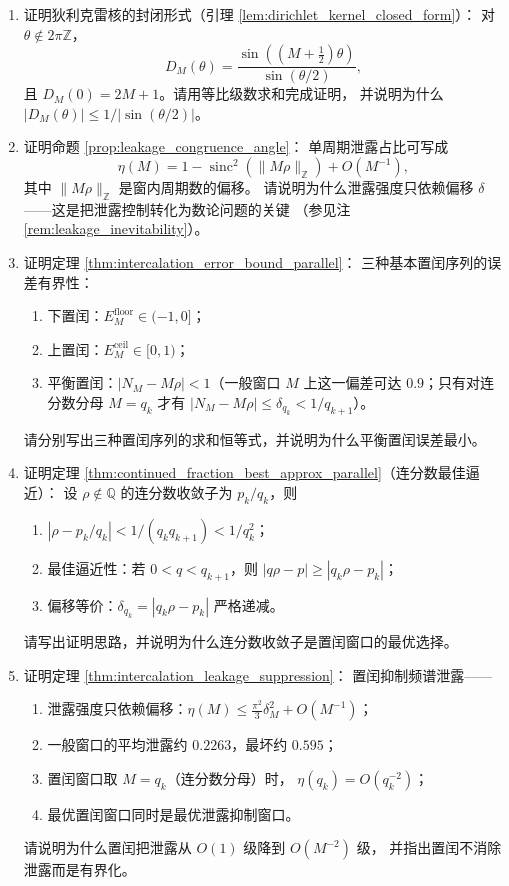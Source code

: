 \begin{enumerate}[leftmargin=3em, label=\textbf{题 \arabic*}]
    \item 证明狄利克雷核的封闭形式（引理 \ref{lem:dirichlet_kernel_closed_form}）：
    对 $\theta\notin2\pi\mathbb{Z}$，
    \[
    D_M(\theta)=\frac{\sin((M+\frac12)\theta)}{\sin(\theta/2)},
    \]
    且 $D_M(0)=2M+1$。请用等比级数求和完成证明，
    并说明为什么 $|D_M(\theta)|\le1/|\sin(\theta/2)|$。

    \item 证明命题 \ref{prop:leakage_congruence_angle}：
    单周期泄露占比可写成
    \[
    \eta(M)=1-\operatorname{sinc}^2(\|M\rho\|_{\mathbb{Z}})+O(M^{-1}),
    \]
    其中 $\|M\rho\|_{\mathbb{Z}}$ 是窗内周期数的偏移。
    请说明为什么泄露强度只依赖偏移 $\delta$——这是把泄露控制转化为数论问题的关键
    （参见注 \ref{rem:leakage_inevitability}）。

    \item 证明定理 \ref{thm:intercalation_error_bound_parallel}：
    三种基本置闰序列的误差有界性：
    \begin{enumerate}[label=(\roman*)]
        \item 下置闰：$E_M^{\mathrm{floor}}\in(-1,0]$；
        \item 上置闰：$E_M^{\mathrm{ceil}}\in[0,1)$；
        \item 平衡置闰：$\big|N_M-M\rho\big|<1$（一般窗口 $M$ 上这一偏差可达 $0.9$；只有对连分数分母 $M=q_k$ 才有 $\big|N_M-M\rho\big|\le\delta_{q_k}<1/q_{k+1}$）。
    \end{enumerate}
    请分别写出三种置闰序列的求和恒等式，并说明为什么平衡置闰误差最小。

    \item 证明定理 \ref{thm:continued_fraction_best_approx_parallel}（连分数最佳逼近）：
    设 $\rho\notin\mathbb{Q}$ 的连分数收敛子为 $p_k/q_k$，则
    \begin{enumerate}[label=(\roman*)]
        \item $|\rho-p_k/q_k|<1/(q_kq_{k+1})<1/q_k^2$；
        \item 最佳逼近性：若 $0<q<q_{k+1}$，则 $|q\rho-p|\ge|q_k\rho-p_k|$；
        \item 偏移等价：$\delta_{q_k}=|q_k\rho-p_k|$ 严格递减。
    \end{enumerate}
    请写出证明思路，并说明为什么连分数收敛子是置闰窗口的最优选择。

    \item 证明定理 \ref{thm:intercalation_leakage_suppression}：
    置闰抑制频谱泄露——
    \begin{enumerate}[label=(\roman*)]
        \item 泄露强度只依赖偏移：$\eta(M)\le\frac{\pi^2}{3}\delta_M^2+O(M^{-1})$；
        \item 一般窗口的平均泄露约 $0.2263$，最坏约 $0.595$；
        \item 置闰窗口取 $M=q_k$（连分数分母）时，
              $\eta(q_k)=O(q_k^{-2})$；
        \item 最优置闰窗口同时是最优泄露抑制窗口。
    \end{enumerate}
    请说明为什么置闰把泄露从 $O(1)$ 级降到 $O(M^{-2})$ 级，
    并指出置闰不消除泄露而是有界化。


\end{enumerate}

